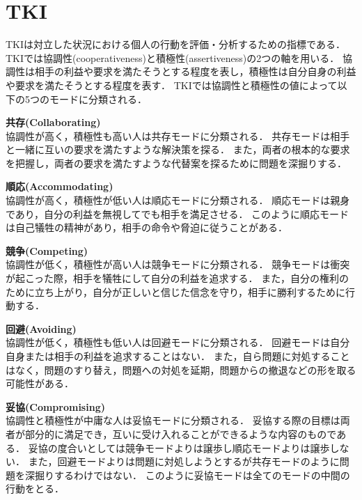 \section{TKI}
\label{sec:tki}
TKIは対立した状況における個人の行動を評価・分析するための指標である\cite{tki}．
TKIでは協調性(cooperativeness)と積極性(assertiveness)の2つの軸を用いる．
協調性は相手の利益や要求を満たそうとする程度を表し，積極性は自分自身の利益や要求を満たそうとする程度を表す．
TKIでは協調性と積極性の値によって以下の5つのモードに分類される．
\begin{description}
    \item{\textbf{共存(Collaborating)}}\mbox{}\\
    協調性が高く，積極性も高い人は共存モードに分類される．
    共存モードは相手と一緒に互いの要求を満たすような解決策を探る．
    また，両者の根本的な要求を把握し，両者の要求を満たすような代替案を探るために問題を深掘りする．
    \item{\textbf{順応(Accommodating)}}\mbox{}\\
    協調性が高く，積極性が低い人は順応モードに分類される．
    順応モードは親身であり，自分の利益を無視してでも相手を満足させる．
    このように順応モードは自己犠牲の精神があり，相手の命令や脅迫に従うことがある．
    \item{\textbf{競争(Competing)}}\mbox{}\\
    協調性が低く，積極性が高い人は競争モードに分類される．
    競争モードは衝突が起こった際，相手を犠牲にして自分の利益を追求する．
    また，自分の権利のために立ち上がり，自分が正しいと信じた信念を守り，相手に勝利するために行動する．
    \item{\textbf{回避(Avoiding)}}\mbox{}\\
    協調性が低く，積極性も低い人は回避モードに分類される．
    回避モードは自分自身または相手の利益を追求することはない．
    また，自ら問題に対処することはなく，問題のすり替え，問題への対処を延期，問題からの撤退などの形を取る可能性がある．
    \item{\textbf{妥協(Compromising)}}\mbox{}\\
    協調性と積極性が中庸な人は妥協モードに分類される．
    妥協する際の目標は両者が部分的に満足でき，互いに受け入れることができるような内容のものである．
    妥協の度合いとしては競争モードよりは譲歩し順応モードよりは譲歩しない．
    また，回避モードよりは問題に対処しようとするが共存モードのように問題を深掘りするわけではない．
    このように妥協モードは全てのモードの中間の行動をとる．
\end{description}


